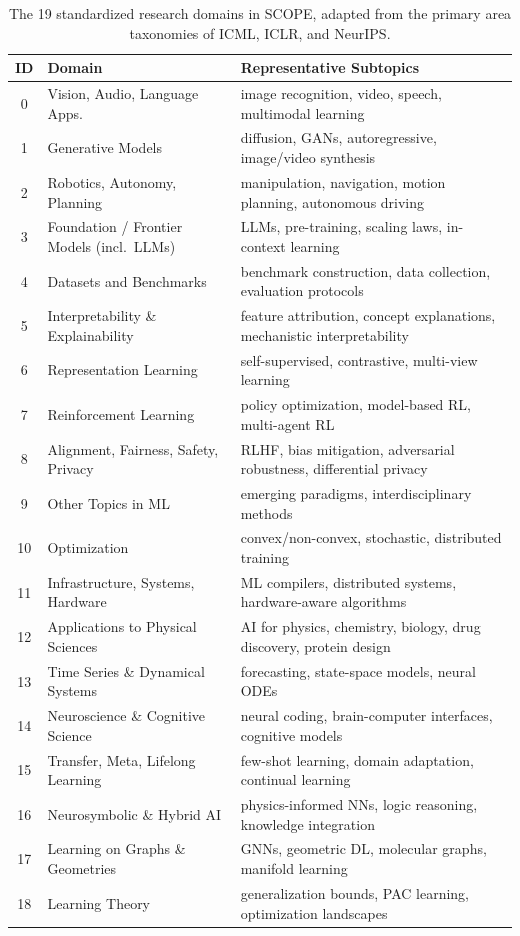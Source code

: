 \begin{table}[htbp]
\centering
\footnotesize
\setlength{\tabcolsep}{1mm}
\renewcommand{\arraystretch}{1.05}
\begin{tabularx}{\columnwidth}{@{}c@{\hskip 1.5mm}>{\raggedright\arraybackslash}p{3.5cm}>{\raggedright\arraybackslash}X@{}}
\toprule
\textbf{ID} & \textbf{Domain} & \textbf{Representative Subtopics} \\
\midrule
0 & Vision, Audio, Language Apps. & image recognition, video, speech, multimodal learning \\
1 & Generative Models & diffusion, GANs, autoregressive, image/video synthesis \\
2 & Robotics, Autonomy, Planning & manipulation, navigation, motion planning, autonomous driving \\
3 & Foundation / Frontier Models (incl.\ LLMs) & LLMs, pre-training, scaling laws, in-context learning \\
4 & Datasets and Benchmarks & benchmark construction, data collection, evaluation protocols \\
5 & Interpretability \& Explainability & feature attribution, concept explanations, mechanistic interpretability \\
6 & Representation Learning & self-supervised, contrastive, multi-view learning \\
7 & Reinforcement Learning & policy optimization, model-based RL, multi-agent RL \\
8 & Alignment, Fairness, Safety, Privacy & RLHF, bias mitigation, adversarial robustness, differential privacy \\
9 & Other Topics in ML & emerging paradigms, interdisciplinary methods \\
10 & Optimization & convex/non-convex, stochastic, distributed training \\
11 & Infrastructure, Systems, Hardware & ML compilers, distributed systems, hardware-aware algorithms \\
12 & Applications to Physical Sciences & AI for physics, chemistry, biology, drug discovery, protein design \\
13 & Time Series \& Dynamical Systems & forecasting, state-space models, neural ODEs \\
14 & Neuroscience \& Cognitive Science & neural coding, brain-computer interfaces, cognitive models \\
15 & Transfer, Meta, Lifelong Learning & few-shot learning, domain adaptation, continual learning \\
16 & Neurosymbolic \& Hybrid AI & physics-informed NNs, logic reasoning, knowledge integration \\
17 & Learning on Graphs \& Geometries & GNNs, geometric DL, molecular graphs, manifold learning \\
18 & Learning Theory & generalization bounds, PAC learning, optimization landscapes \\
\bottomrule
\end{tabularx}
\caption{The 19 standardized research domains in \textsc{SCOPE}, adapted from the primary area taxonomies of ICML, ICLR, and NeurIPS.}
\label{tab:domains}
\end{table}

